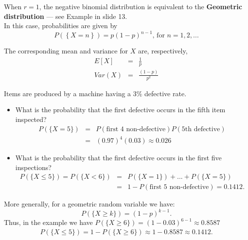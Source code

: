 \documentclass[smaller, handout]{beamer}\usepackage[]{graphicx}\usepackage[]{color}
\renewcommand{\Pr}{P}
\newcommand{\bea}{\begin{eqnarray}}
\newcommand{\eea}{\end{eqnarray}}
\newcommand{\nn}{\nonumber}
\begin{document}
\begin{frame}{\secname}%


\begin{definition}

When $r=1$, the negative binomial distribution is equivalent to the
\textbf{Geometric distribution} --- see Example in slide 13. \\
\vspace{0.5cm}
In this case, probabilities are given by%
\begin{equation*}
\Pr (\left\{ X=n\right\}) =p\left( 1-p\right) ^{n-1}\text{, for }n=1,2,...
\end{equation*}
\end{definition}

The corresponding mean and variance for $X$ are, respectively,%
\begin{eqnarray*}
E\left[ X\right] &=&\frac{ 1 }{p} \\
Var\left( X\right) &=&\frac{\left( 1-p\right) }{p^{2}}
\end{eqnarray*}


\end{frame}

\begin{frame}{\secname}

\begin{small}

\begin{example}
Items are produced by a machine having a 3\% defective rate.
\begin{itemize}
\item What is the probability that the first defective occurs in the fifth item inspected? \\
\bea
P(\{X	=	5\})	&=&	P (\text{first	4	non-defective}) P (\text{5th defective}) \nn \\
&=& (0.97)^4(0.03) \approx 0.026 \nn
\eea
\item What is the probability that the first defective occurs in the first five inspections?
\bea
P(\{X	\leq 5	\}) = P(\{X	< 6	\})	&=&	 P (\{X=1\})+ ... + P(\{X=5\}) \nn \\
&=& 1- P(\text{first 5 non-defective}) = 0.1412.  \nn %
\eea
\end{itemize}
\end{example}

More generally, for a geometric random variable we have:
$$
P(\{X \geq k \}) = (1-p)^{k-1}.
$$
Thus, in the example we have $P( \{X	\geq 6	\}) = (1-0.03)^{6-1}\approx 0.8587$
\bea
P(\{X	\leq 5	\}) = 1-P( \{X	\geq 6	\}) \approx 1- 0.8587 \approx 0.1412. \nn
\eea

\end{small}



\end{frame}
\end{document}
